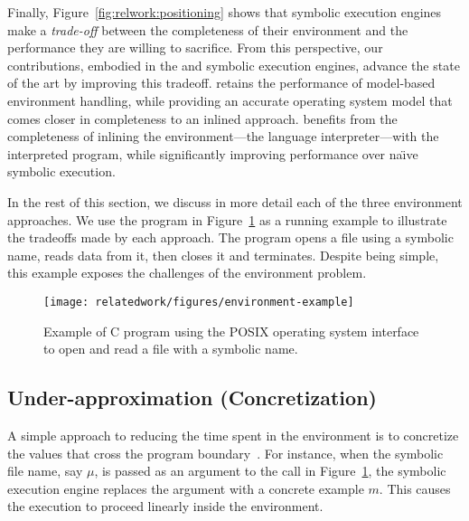 Finally, Figure~\ref{fig:relwork:positioning} shows that symbolic execution engines make a \emph{trade-off} between the completeness of their environment and the performance they are willing to sacrifice.
%
From this perspective, our contributions, embodied in the \chef and \cnine symbolic execution engines, advance the state of the art by improving this tradeoff.
%
\cnine retains the performance of model-based environment handling, while providing an accurate operating system model that comes closer in completeness to an inlined approach.
%
\chef benefits from the completeness of inlining the environment---the language interpreter---with the interpreted program, while significantly improving performance over na\"{\i}ve symbolic execution.

In the rest of this section, we discuss in more detail each of the three environment approaches.
%
We use the program in Figure~\ref{fig:relwork:example} as a running example to illustrate the tradeoffs made by each approach.
%
The program opens a file using a symbolic name, reads data from it, then closes it and terminates.  Despite being simple, this example exposes the challenges of the environment problem.

\begin{figure}
  \centering
  \texttt{[image: relatedwork/figures/environment-example]}
  \caption{Example of C program using the POSIX operating system interface to open and read a file with a symbolic name.}
  \label{fig:relwork:example}
\end{figure}

\subsection{Under-approximation (Concretization)}

A simple approach to reducing the time spent in the environment is to concretize the values that cross the program boundary~\cite{dart,godefroid:fuzz,klee,exe}.
%
For instance, when the symbolic file name, say $\mu$, is passed as an argument to the  call in Figure~\ref{fig:relwork:example}, the symbolic execution engine replaces the argument with a concrete example $m$.  This causes the execution to proceed linearly inside the environment.


